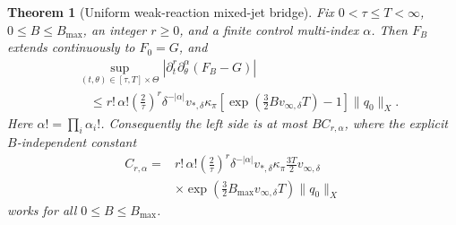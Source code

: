 \documentclass[aps,physrev,onecolumn,amsmath,amssymb,longbibliography]{revtex4-2}
\newtheorem{theorem}{Theorem}[section]
\begin{document}
\begin{theorem}[Uniform weak-reaction mixed-jet bridge]
\label{thm:mixed-jet}
Fix \(0<\tau\le T<\infty\), \(0\le B\le B_{\max}\), an integer \(r\ge0\),
and a finite control multi-index \(\alpha\).  Then \(F_B\) extends
continuously to \(F_0=G\), and
\begin{align}
 &\sup_{(t,\theta)\in[\tau,T]\times\Theta}
 \left|\partial_t^r\partial_\theta^\alpha(F_B-G)\right|
 \nonumber\\
 &\quad\le
 r!\,\alpha!\left(\frac2\tau\right)^r
 \delta^{-|\alpha|}v_{*,\delta}\kappa_\pi
 \left[\exp\!\left(\frac32Bv_{\infty,\delta}T\right)-1\right]
 \|q_0\|_X.
 \label{eq:mixed-jet-bound}
\end{align}
Here \(\alpha!=\prod_i\alpha_i!\).  Consequently the left side is at most
\(BC_{r,\alpha}\), where the explicit \(B\)-independent constant
\begin{align}
 C_{r,\alpha}={}&
 r!\,\alpha!\left(\frac2\tau\right)^r
 \delta^{-|\alpha|}v_{*,\delta}\kappa_\pi
 \frac{3T}{2}v_{\infty,\delta}\nonumber\\
 &\times
 \exp\!\left(\frac32B_{\max}v_{\infty,\delta}T\right)
 \|q_0\|_X
 \label{eq:mixed-jet-linear-constant}
\end{align}
works for all \(0\le B\le B_{\max}\).
\end{theorem}
\end{document}

